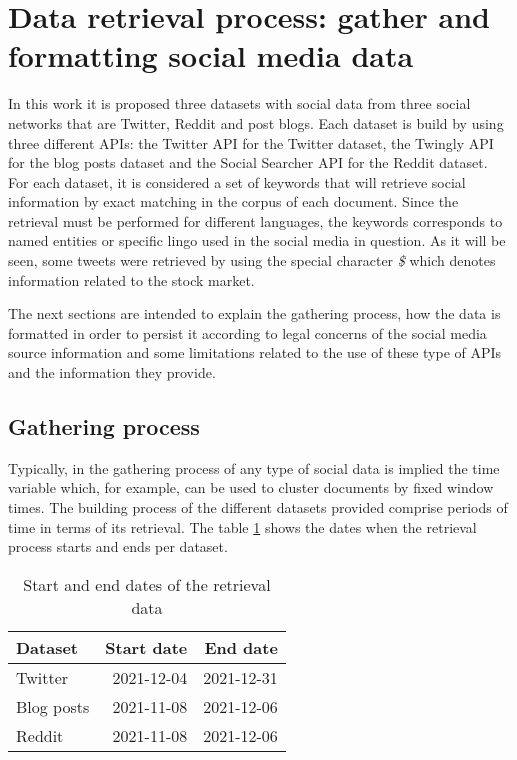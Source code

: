 \section{Data retrieval process: gather and formatting social media data}

In this work it is proposed three datasets with social data from three social networks that are Twitter, Reddit and post blogs. Each dataset is build by using three different APIs: the Twitter API for the Twitter dataset, the Twingly API for the blog posts dataset and the Social Searcher API for the Reddit dataset. For each dataset, it is considered a set of keywords that will retrieve social information by exact matching in the corpus of each document. Since the retrieval must be performed for different languages, the keywords corresponds to named entities or specific lingo used in the social media in question. As it will be seen, some tweets were retrieved by using the special character \textit{\$} which denotes information related to the stock market.

\par The next sections are intended to explain the gathering process, how the data is formatted in order to persist it according to legal concerns of the social media source information and some limitations related to the use of these type of APIs and the information they provide.
\subsection{Gathering process}
Typically, in the gathering process of any type of social data is implied the time variable which, for example,  can be used to cluster documents by fixed window times. The building process of the different datasets provided comprise periods of time in terms of its retrieval. The table \ref{table:periodTime} shows the dates when the retrieval process starts and ends per dataset.

\begin{table}[htb]
	\begin{center}
		\begin{tabular}{|l|r|r|}
			\hline
			\textbf{Dataset} &    \textbf{Start date } &\textbf{ End date}\\
			\hline \hline
			Twitter              &  2021-12-04  &  2021-12-31\\ 
			\hline
			Blog posts &  2021-11-08 	& 2021-12-06 \\
			\hline
			Reddit &  2021-11-08   	& 2021-12-06 \\
			\hline
		\end{tabular}
	\end{center}
	\caption{Start and end dates of the retrieval data}
	\label{table:periodTime}
\end{table}

